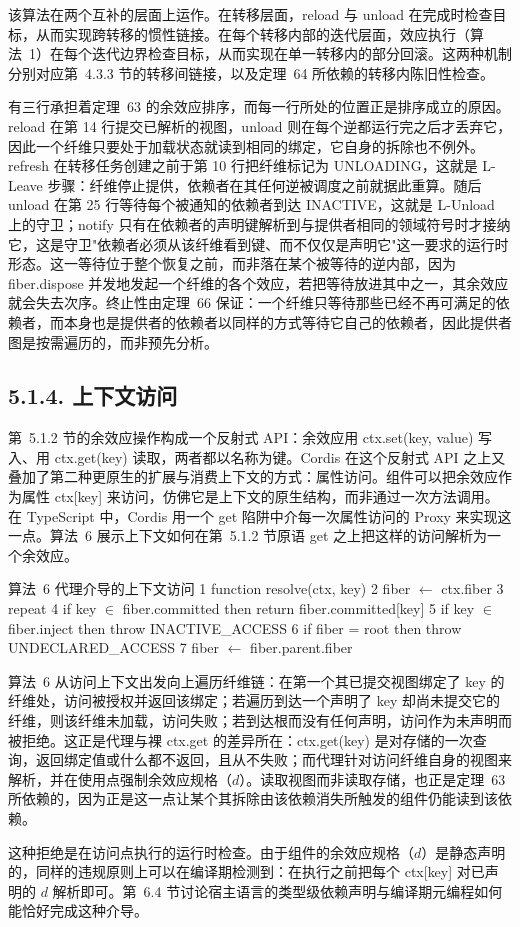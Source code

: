 该算法在两个互补的层面上运作。在转移层面，reload 与 unload 在完成时检查目标，从而实现跨转移的惯性链接。在每个转移内部的迭代层面，效应执行（算法~1）在每个迭代边界检查目标，从而实现在单一转移内的部分回滚。这两种机制分别对应第~4.3.3 节的转移间链接，以及定理~64 所依赖的转移内陈旧性检查。

有三行承担着定理~63 的余效应排序，而每一行所处的位置正是排序成立的原因。reload 在第 14 行提交已解析的视图，unload 则在每个逆都运行完之后才丢弃它，因此一个纤维只要处于加载状态就读到相同的绑定，它自身的拆除也不例外。refresh 在转移任务创建之前于第 10 行把纤维标记为 UNLOADING，这就是 L-Leave 步骤：纤维停止提供，依赖者在其任何逆被调度之前就据此重算。随后 unload 在第 25 行等待每个被通知的依赖者到达 INACTIVE，这就是 L-Unload 上的守卫；notify 只有在依赖者的声明键解析到与提供者相同的领域符号时才接纳它，这是守卫"依赖者必须从该纤维看到键、而不仅仅是声明它"这一要求的运行时形态。这一等待位于整个恢复之前，而非落在某个被等待的逆内部，因为 fiber.dispose 并发地发起一个纤维的各个效应，若把等待放进其中之一，其余效应就会失去次序。终止性由定理~66 保证：一个纤维只等待那些已经不再可满足的依赖者，而本身也是提供者的依赖者以同样的方式等待它自己的依赖者，因此提供者图是按需遍历的，而非预先分析。

\subsection{5.1.4. 上下文访问}\label{context-access}

第~5.1.2 节的余效应操作构成一个反射式 API：余效应用 ctx.set(key, value) 写入、用 ctx.get(key) 读取，两者都以名称为键。Cordis 在这个反射式 API 之上又叠加了第二种更原生的扩展与消费上下文的方式：属性访问。组件可以把余效应作为属性 ctx{[}key{]} 来访问，仿佛它是上下文的原生结构，而非通过一次方法调用。在 TypeScript 中，Cordis 用一个 get 陷阱中介每一次属性访问的 Proxy 来实现这一点。算法~6 展示上下文如何在第~5.1.2 节原语 get 之上把这样的访问解析为一个余效应。

算法~6 代理介导的上下文访问
1 function resolve(ctx, key)
2 fiber $\leftarrow$ ctx.fiber
3 repeat
4 if key $\in$ fiber.committed then return fiber.committed{[}key{]}
5 if key $\in$ fiber.inject then throw INACTIVE\_ACCESS
6 if fiber = root then throw UNDECLARED\_ACCESS
7 fiber $\leftarrow$ fiber.parent.fiber

算法~6 从访问上下文出发向上遍历纤维链：在第一个其已提交视图绑定了 key 的纤维处，访问被授权并返回该绑定；若遍历到达一个声明了 key 却尚未提交它的纤维，则该纤维未加载，访问失败；若到达根而没有任何声明，访问作为未声明而被拒绝。这正是代理与裸 ctx.get 的差异所在：ctx.get(key) 是对存储的一次查询，返回绑定值或什么都不返回，且从不失败；而代理针对访问纤维自身的视图来解析，并在使用点强制余效应规格（\(d\)）。读取视图而非读取存储，也正是定理~63 所依赖的，因为正是这一点让某个其拆除由该依赖消失所触发的组件仍能读到该依赖。

这种拒绝是在访问点执行的运行时检查。由于组件的余效应规格（\(d\)）是静态声明的，同样的违规原则上可以在编译期检测到：在执行之前把每个 ctx{[}key{]} 对已声明的 \(d\) 解析即可。第~6.4 节讨论宿主语言的类型级依赖声明与编译期元编程如何能恰好完成这种介导。
